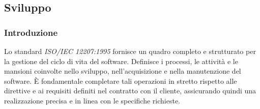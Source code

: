 \subsection{Sviluppo}
\subsubsection{Introduzione}
Lo standard \textit{ISO/IEC 12207:1995} fornisce un quadro completo e strutturato per la gestione del ciclo di vita del software. Definisce i processi, le attività e le mansioni coinvolte nello sviluppo, nell'acquisizione e nella manutenzione del software.
È fondamentale completare tali operazioni in stretto rispetto alle direttive e ai requisiti definiti nel contratto con il cliente, assicurando quindi una realizzazione precisa e in linea con le specifiche richieste.


